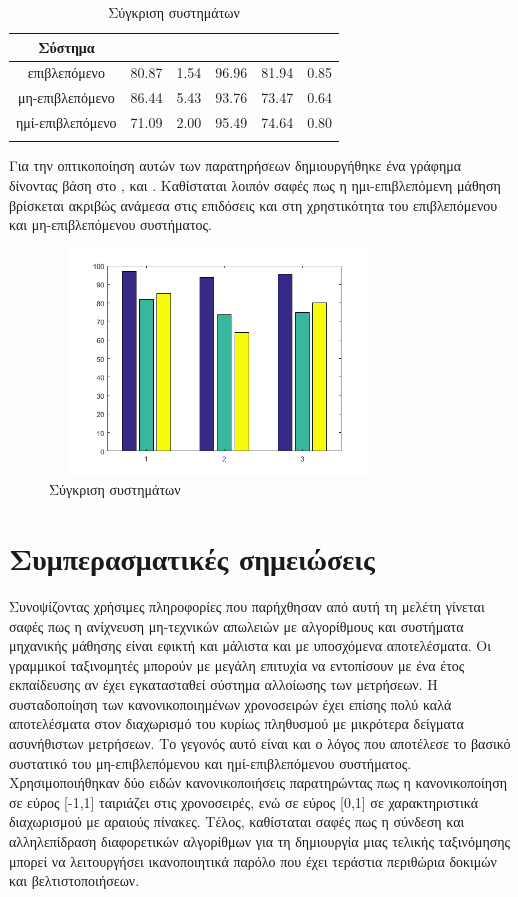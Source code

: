 \begin{center}
\begin{longtabu}  to 0.8\textwidth { | c || c | c | c | c | c |  }
 \hline
Σύστημα &   &  &  &  &   \\
 \hline
επιβλεπόμενο & 80.87 & 1.54 & 96.96 & 81.94 & 0.85 \\
μη-επιβλεπόμενο & 86.44	& 5.43 & 93.76 & 73.47 & 0.64\\
ημί-επιβλεπόμενο & 71.09 & 2.00 & 95.49 & 74.64 & 0.80\\
\hline
\caption{Σύγκριση συστημάτων}
\label{tab:comparesystems}
\end{longtabu}
\end{center}

Για την οπτικοποίηση αυτών των παρατηρήσεων δημιουργήθηκε ένα γράφημα δίνοντας βάση στο ,  και . Καθίσταται λοιπόν σαφές πως η ημι-επιβλεπόμενη μάθηση βρίσκεται ακριβώς ανάμεσα στις επιδόσεις και στη χρηστικότητα του επιβλεπόμενου και μη-επιβλεπόμενου συστήματος.

\begin{figure}[ht!]
\centering
 \includegraphics[width=90mm, height=60mm]{../../plots/comparison_systems.png}
 \caption{Σύγκριση συστημάτων}
\label{fig:comparisonsystem}
 \end{figure}
\section{Συμπερασματικές σημειώσεις}
Συνοψίζοντας χρήσιμες πληροφορίες που παρήχθησαν από αυτή τη μελέτη γίνεται σαφές πως η ανίχνευση μη-τεχνικών απωλειών με αλγορίθμους και συστήματα μηχανικής μάθησης είναι εφικτή και μάλιστα και με υποσχόμενα αποτελέσματα. Οι γραμμικοί ταξινομητές μπορούν με μεγάλη επιτυχία να εντοπίσουν με ένα έτος  εκπαίδευσης αν έχει εγκατασταθεί σύστημα αλλοίωσης των μετρήσεων. Η συσταδοποίηση των κανονικοποιημένων χρονοσειρών έχει επίσης πολύ καλά αποτελέσματα στον διαχωρισμό του κυρίως πληθυσμού με μικρότερα δείγματα ασυνήθιστων μετρήσεων. Το γεγονός αυτό είναι και ο λόγος που αποτέλεσε το βασικό συστατικό του μη-επιβλεπόμενου και ημί-επιβλεπόμενου συστήματος. Χρησιμοποιήθηκαν δύο ειδών κανονικοποιήσεις παρατηρώντας πως η κανονικοποίηση σε εύρος [-1,1] ταιριάζει στις χρονοσειρές, ενώ σε εύρος [0,1] σε χαρακτηριστικά διαχωρισμού  με αραιούς πίνακες. Τέλος, καθίσταται σαφές πως η σύνδεση και αλληλεπίδραση διαφορετικών αλγορίθμων για τη δημιουργία μιας τελικής ταξινόμησης μπορεί να λειτουργήσει ικανοποιητικά παρόλο που έχει τεράστια περιθώρια δοκιμών και βελτιστοποιήσεων.
